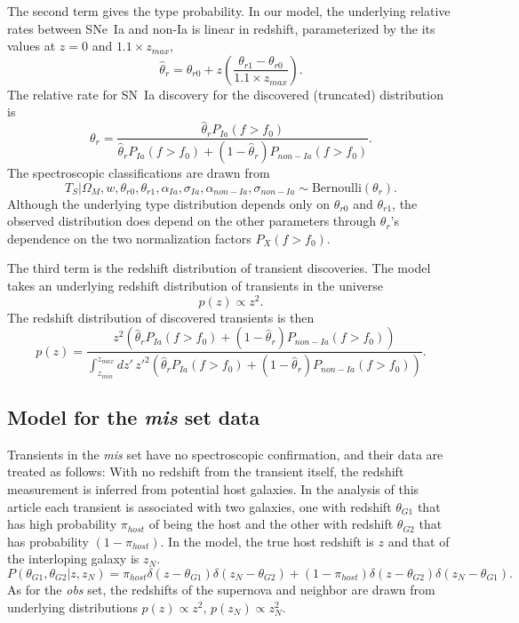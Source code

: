 \documentclass[preprint,3p]{elsarticle}
\begin{document}
The second term gives the type probability. In our model,
the underlying relative rates between SNe~Ia and non-Ia is linear in redshift,
 parameterized by the
its values at $z=0$ and $1.1 \times z_{max}$, 
\begin{equation}
\hat{\theta}_r=\theta_{r0}+z\left(\frac{\theta_{r1}-\theta_{r0}}{1.1 \times z_{max}}\right).
\label{rate:eqn}
\end{equation}
The relative rate for SN~Ia discovery for the discovered (truncated) distribution is
\begin{equation}
\theta_r=\frac{\hat{\theta}_rP_{Ia}(f > f_0)}{\hat{\theta}_{r}P_{Ia}(f > f_0) + (1-\hat{\theta}_{r})P_{non-Ia}(f > f_0)}.
\end{equation}
The spectroscopic classifications are drawn from
\begin{equation}
T_S | \Omega_M, w, \theta_{r0}, \theta_{r1} , \alpha_{Ia},\sigma_{Ia}, \alpha_{\mathit{non-Ia}},\sigma_{\mathit{non-Ia}} \sim \text{Bernoulli}(\theta_r).
\end{equation}
Although the underlying type distribution depends only on $ \theta_{r0}$ and $ \theta_{r1}$,  
the observed distribution does depend on the other parameters through $\theta_r$'s dependence on
the two normalization factors
$P_{X}(f > f_0)$.

The third term is the redshift distribution of transient discoveries.
The model takes an underlying redshift distribution of transients in the universe
\begin{equation}
p(z) \propto z^2.
\end{equation}
The redshift distribution of discovered transients is then
\begin{equation}
p(z) = \frac{z^2\left(\hat{\theta}_{r}P_{Ia}(f > f_0) + (1-\hat{\theta}_{r})P_{non-Ia}(f > f_0)
\right)}{\int_{z_{min}}^{z_{max}} dz'\, z'^2\left( 
\hat{\theta}_{r}P_{Ia}(f > f_0) + (1-\hat{\theta}_{r})P_{non-Ia}(f > f_0)
\right)}.
\end{equation}


\subsection{Model for the {\it mis} set data}

Transients in the {\it mis}
set have no spectroscopic confirmation, and their data are treated as follows:
With no redshift from the transient itself, 
the redshift measurement is inferred from potential host galaxies.
In the analysis of this article each transient is associated with two galaxies, one 
with redshift $\theta_{G1}$
that has high probability $\pi_{host}$
of being the host and the other
with redshift $\theta_{G2}$ that has probability $(1-\pi_{host})$.
In the model, the
true host redshift is $z$ and that of the interloping galaxy is $z_N$.
\begin{equation}
P(\theta_{G1},\theta_{G2}|z, z_N) =
	\pi_{host}\delta(z-\theta_{G1})\delta(z_N-\theta_{G2}) +
	(1-\pi_{host}) \delta(z-\theta_{G2})\delta(z_N-\theta_{G1}).
\end{equation}
As for the {\it obs} set, the redshifts of the supernova
 and neighbor are drawn from underlying distributions $p(z) \propto z^2$, $p(z_N) \propto z^2_N$.
\end{document}
